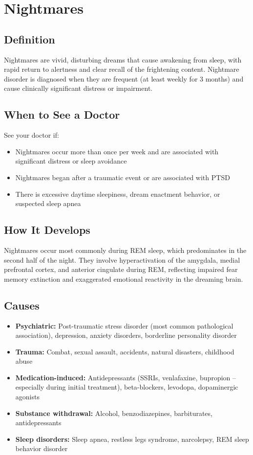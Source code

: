 \chapter{Nightmares}

\section*{Definition}
Nightmares are vivid, disturbing dreams that cause awakening from sleep, with rapid return to alertness and clear recall of the frightening content. Nightmare disorder is diagnosed when they are frequent (at least weekly for 3 months) and cause clinically significant distress or impairment.

\section*{When to See a Doctor}
See your doctor if:
\begin{itemize}
  \item Nightmares occur more than once per week and are associated with significant distress or sleep avoidance
  \item Nightmares began after a traumatic event or are associated with PTSD
  \item There is excessive daytime sleepiness, dream enactment behavior, or suspected sleep apnea
\end{itemize}

\section*{How It Develops}
Nightmares occur most commonly during REM sleep, which predominates in the second half of the night. They involve hyperactivation of the amygdala, medial prefrontal cortex, and anterior cingulate during REM, reflecting impaired fear memory extinction and exaggerated emotional reactivity in the dreaming brain.

\section*{Causes}
\begin{itemize}
  \item \textbf{Psychiatric:} Post-traumatic stress disorder (most common pathological association), depression, anxiety disorders, borderline personality disorder
  \item \textbf{Trauma:} Combat, sexual assault, accidents, natural disasters, childhood abuse
  \item \textbf{Medication-induced:} Antidepressants (SSRIs, venlafaxine, bupropion -- especially during initial treatment), beta-blockers, levodopa, dopaminergic agonists
  \item \textbf{Substance withdrawal:} Alcohol, benzodiazepines, barbiturates, antidepressants
  \item \textbf{Sleep disorders:} Sleep apnea, restless legs syndrome, narcolepsy, REM sleep behavior disorder
\end{itemize}

